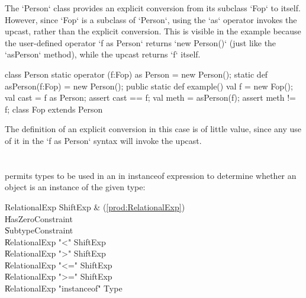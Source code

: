 \begin{ex}
The \xcd`Person` class provides an explicit conversion 
from its subclass \xcd`Fop` to itself. 
However, since \xcd`Fop` is a subclass of \xcd`Person`, 
using the \xcd`as` operator invokes the upcast, rather than the explicit
conversion.  This is visible in the example because the user-defined operator 
\xcd`f as Person` returns \xcd`new Person()` (just like the \xcd`asPerson`
method), while the 
upcast returns \xcd`f` itself.  
\begin{xten}
class Person {
  static operator (f:Fop) as Person = new Person();
  static def asPerson(f:Fop) = new Person();
  public static def example() {
     val f = new Fop();
     val cast = f as Person;
     assert cast == f;
     val meth = asPerson(f);
     assert meth != f;
  }
}
class Fop extends Person {}
\end{xten}

The definition of an explicit conversion in this case is of little value,
since any use of it in the \xcd`f as Person` syntax will invoke the upcast.  
\end{ex}

\section{}
\label{instanceOf}

\Xten{} permits types to be used in an in instanceof expression
to determine whether an object is an instance of the given type:

\begin{bbgrammar}
       RelationalExp \: ShiftExp & (\ref{prod:RelationalExp}) \\
                     \| HasZeroConstraint \\
                     \| SubtypeConstraint \\
                     \| RelationalExp \xcd"<" ShiftExp \\
                     \| RelationalExp \xcd">" ShiftExp \\
                     \| RelationalExp \xcd"<=" ShiftExp \\
                     \| RelationalExp \xcd">=" ShiftExp \\
                     \| RelationalExp \xcd"instanceof" Type \\
\end{bbgrammar}

